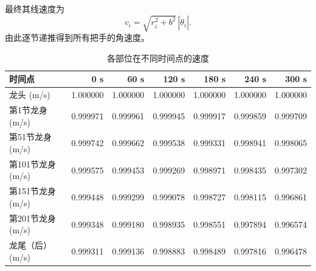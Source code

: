 最终其线速度为
\begin{equation}
    v_i
    =
    \sqrt{r_i^2+b^2}\,|\dot{\theta}_i|.
\end{equation}
由此逐节递推得到所有把手的角速度。

\begin{table}[htbp]
    \centering
    \small
    \caption{各部位在不同时间点的速度}
    \label{tab:speed}
    \begin{tabular}{l|r|r|r|r|r|r}
        \hline
        时间点 & 0 s & 60 s & 120 s & 180 s & 240 s & 300 s \\
        \hline
        龙头 (m/s)       & 1.000000 & 1.000000 & 1.000000 & 1.000000 & 1.000000 & 1.000000 \\
        第1节龙身 (m/s)  & 0.999971 & 0.999961 & 0.999945 & 0.999917 & 0.999859 & 0.999709 \\
        第51节龙身 (m/s) & 0.999742 & 0.999662 & 0.999538 & 0.999331 & 0.998941 & 0.998065 \\
        第101节龙身 (m/s)& 0.999575 & 0.999453 & 0.999269 & 0.998971 & 0.998435 & 0.997302 \\
        第151节龙身 (m/s)& 0.999448 & 0.999299 & 0.999078 & 0.998727 & 0.998115 & 0.996861 \\
        第201节龙身 (m/s)& 0.999348 & 0.999180 & 0.998935 & 0.998551 & 0.997894 & 0.996574 \\
        龙尾（后） (m/s) & 0.999311 & 0.999136 & 0.998883 & 0.998489 & 0.997816 & 0.996478 \\
        \hline
    \end{tabular}
\end{table}

